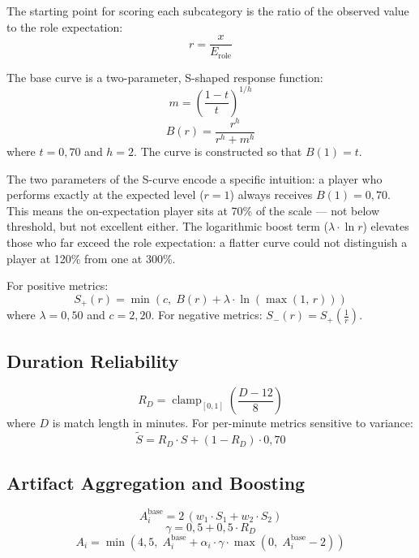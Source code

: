 The starting point for scoring each subcategory is the ratio of the observed value to the role expectation:
\begin{equation}
r = \frac{x}{E_{\text{role}}}
\end{equation}

The base curve is a two-parameter, S-shaped response function:
\begin{equation}
m = \left(\frac{1-t}{t}\right)^{1/h}
\end{equation}
\begin{equation}
B(r) = \frac{r^h}{r^h + m^h}
\end{equation}
where $t = 0{,}70$ and $h = 2$. The curve is constructed so that $B(1) = t$.

The two parameters of the S-curve encode a specific intuition: a player who performs exactly at the expected level ($r=1$) always receives $B(1) = 0{,}70$. This means the on-expectation player sits at 70\% of the scale --- not below threshold, but not excellent either. The logarithmic boost term ($\lambda \cdot \ln r$) elevates those who far exceed the role expectation: a flatter curve could not distinguish a player at 120\% from one at 300\%.

For positive metrics:
\begin{equation}
S_+(r) = \min\!\left(c,\; B(r) + \lambda \cdot \ln\!\left(\max(1,\, r)\right)\right)
\end{equation}
where $\lambda = 0{,}50$ and $c = 2{,}20$. For negative metrics: $S_-(r) = S_+\!\left(\frac{1}{r}\right)$.

\subsection{Duration Reliability}

\begin{equation}
R_D = \operatorname{clamp}_{[0,1]}\!\left(\frac{D - 12}{8}\right)
\end{equation}
where $D$ is match length in minutes. For per-minute metrics sensitive to variance:
\begin{equation}
\tilde{S} = R_D \cdot S + (1 - R_D) \cdot 0{,}70
\end{equation}

\subsection{Artifact Aggregation and Boosting}

\begin{equation}
A_i^{\text{base}} = 2\,(w_1 \cdot S_1 + w_2 \cdot S_2)
\end{equation}
\begin{equation}
\gamma = 0{,}5 + 0{,}5 \cdot R_D
\end{equation}
\begin{equation}
A_i = \min\!\left(4{,}5,\; A_i^{\text{base}} + \alpha_i \cdot \gamma \cdot \max\!\left(0,\; A_i^{\text{base}} - 2\right)\right)
\end{equation}

